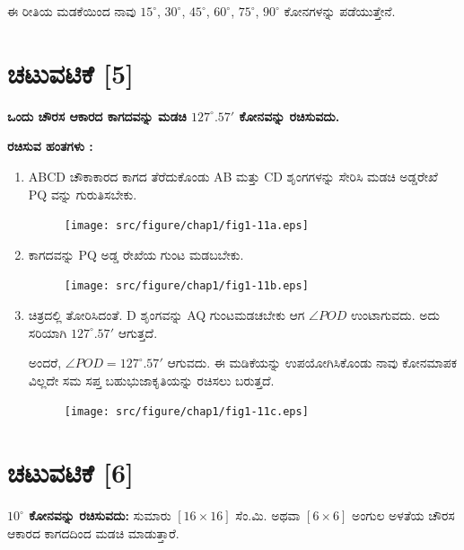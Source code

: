 ಈ ರೀತಿಯ ಮಡಕೆಯಿಂದ ನಾವು $15^\circ$, $30^\circ$, $45^\circ$, $60^\circ$, $75^\circ$, $90^\circ$ ಕೋನಗಳನ್ನು ಪಡೆಯುತ್ತೇನೆ. 

\section*{ಚಟುವಟಿಕೆ [5]} \textbf{ಒಂದು ಚೌರಸ ಆಕಾರದ ಕಾಗದವನ್ನು ಮಡಚಿ $127^\circ.57'$ ಕೋನವನ್ನು ರಚಿಸುವದು.}

\noindent
\textbf{ರಚಿಸುವ ಹಂತಗಳು :}
\begin{enumerate}
\item ABCD ಚೌಕಾಕಾರದ ಕಾಗದ ತೆರೆದುಕೊಂಡು  AB ಮತ್ತು CD  ಶೃಂಗಗಳನ್ನು ಸೇರಿಸಿ ಮಡಚಿ ಅಡ್ಡರೇಖೆ PQ ವನ್ನು ಗುರುತಿಸಬೇಕು.
\begin{figure}[H]
\centering
\texttt{[image: src/figure/chap1/fig1-11a.eps]}
\end{figure}

\item ಕಾಗದವನ್ನು PQ ಅಡ್ಡ ರೇಖೆಯ ಗುಂಟ ಮಡಬಬೇಕು.  
\begin{figure}[H]
\centering
\texttt{[image: src/figure/chap1/fig1-11b.eps]}
\end{figure}

\item ಚಿತ್ರದಲ್ಲಿ ತೋರಿಸಿದಂತೆ. D ಶೃಂಗವನ್ನು AQ ಗುಂಟಮಡಚಬೇಕು ಆಗ  $\angle POD$ ಉಂಟಾಗುವದು. ಅದು ಸರಿಯಾಗಿ $127^\circ.57'$ ಆಗುತ್ತದೆ. 

ಅಂದರೆ, $\angle POD = 127^\circ.57'$ ಆಗುವದು. ಈ ಮಡಿಕೆಯನ್ನು ಉಪಯೋಗಿಸಿಕೊಂಡು ನಾವು ಕೋನಮಾಪಕ ವಿಲ್ಲದೇ ಸಮ ಸಪ್ತ ಬಹುಭುಜಾಕೃತಿಯನ್ನು ರಚಿಸಲು ಬರುತ್ತದೆ. 
\begin{figure}[H]
\centering
\texttt{[image: src/figure/chap1/fig1-11c.eps]}
\end{figure}
\end{enumerate}

\section*{ಚಟುವಟಿಕೆ [6]} \textbf{$10^\circ$ ಕೋನವನ್ನು ರಚಿಸುವದು:} ಸುಮಾರು $[16 \times 16]$ ಸೆಂ.ಮಿ. ಅಥವಾ  $[6 \times 6]$ ಅಂಗುಲ ಅಳತೆಯ ಚೌರಸ ಆಕಾರದ ಕಾಗದದಿಂದ ಮಡಚಿ ಮಾಡುತ್ತಾರೆ. 

